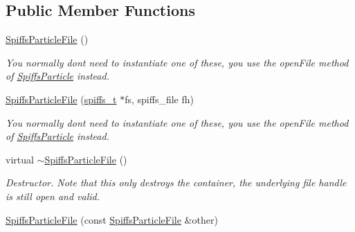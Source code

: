 \subsection*{Public Member Functions}
\begin{DoxyCompactItemize}
\item 
\mbox{\label{class_spiffs_particle_file_ae1d791cb24dd193cb76297f37c2902ac}} 
\mbox{\hyperlink{class_spiffs_particle_file_ae1d791cb24dd193cb76297f37c2902ac}{Spiffs\+Particle\+File}} ()
\begin{DoxyCompactList}\small\item\em You normally don\textquotesingle{}t need to instantiate one of these, you use the {\ttfamily open\+File} method of \mbox{\hyperlink{class_spiffs_particle}{Spiffs\+Particle}} instead. \end{DoxyCompactList}\item 
\mbox{\label{class_spiffs_particle_file_a632c82180b1235744301f5eb88168c5b}} 
\mbox{\hyperlink{class_spiffs_particle_file_a632c82180b1235744301f5eb88168c5b}{Spiffs\+Particle\+File}} (\mbox{\hyperlink{structspiffs__t}{spiffs\+\_\+t}} $\ast$fs, spiffs\+\_\+file fh)
\begin{DoxyCompactList}\small\item\em You normally don\textquotesingle{}t need to instantiate one of these, you use the {\ttfamily open\+File} method of \mbox{\hyperlink{class_spiffs_particle}{Spiffs\+Particle}} instead. \end{DoxyCompactList}\item 
\mbox{\label{class_spiffs_particle_file_a8d5ba5d2abd9082bc1dab48a2c5aa685}} 
virtual \mbox{\hyperlink{class_spiffs_particle_file_a8d5ba5d2abd9082bc1dab48a2c5aa685}{$\sim$\+Spiffs\+Particle\+File}} ()
\begin{DoxyCompactList}\small\item\em Destructor. Note that this only destroys the container, the underlying file handle is still open and valid. \end{DoxyCompactList}\item 
\mbox{\label{class_spiffs_particle_file_ab8d1c9d77137ae02336caad3ee4503af}} 
\mbox{\hyperlink{class_spiffs_particle_file_ab8d1c9d77137ae02336caad3ee4503af}{Spiffs\+Particle\+File}} (const \mbox{\hyperlink{class_spiffs_particle_file}{Spiffs\+Particle\+File}} \&other)

\end{DoxyCompactItemize}
